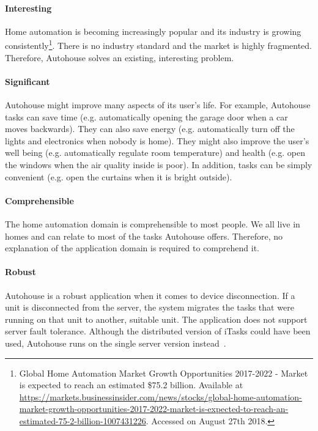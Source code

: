 \paragraph{Interesting} Home automation is becoming increasingly popular and its industry is growing consistently\footnote{Global Home Automation Market Growth Opportunities 2017-2022 - Market is expected to reach an estimated \$75.2 billion. Available at \url{https://markets.businessinsider.com/news/stocks/global-home-automation-market-growth-opportunities-2017-2022-market-is-expected-to-reach-an-estimated-75-2-billion-1007431226}. Accessed on August 27th 2018.}. There is no industry standard and the market is highly fragmented. Therefore, Autohouse solves an existing, interesting problem.

\paragraph{Significant} Autohouse might improve many aspects of its user's life. For example, Autohouse tasks can save time (e.g. automatically opening the garage door when a car moves backwards). They can also save energy (e.g. automatically turn off the lights and electronics when nobody is home). They might also improve the user's well being (e.g. automatically regulate room temperature) and health (e.g. open the windows when the air quality inside is poor). In addition, tasks can be simply convenient (e.g. open the curtains when it is bright outside).

\paragraph{Comprehensible} The home automation domain is comprehensible to most people. We all live in homes and can relate to most of the tasks Autohouse offers. Therefore, no explanation of the application domain is required to comprehend it. 

\paragraph{Robust} Autohouse is a robust application when it comes to device disconnection. If a unit is disconnected from the server, the system migrates the tasks that were running on that unit to another, suitable unit. The application does not support server fault tolerance. Although the distributed version of \gls{iTasks} could have been used, Autohouse runs on the single server version instead~\cite{distributed}.

